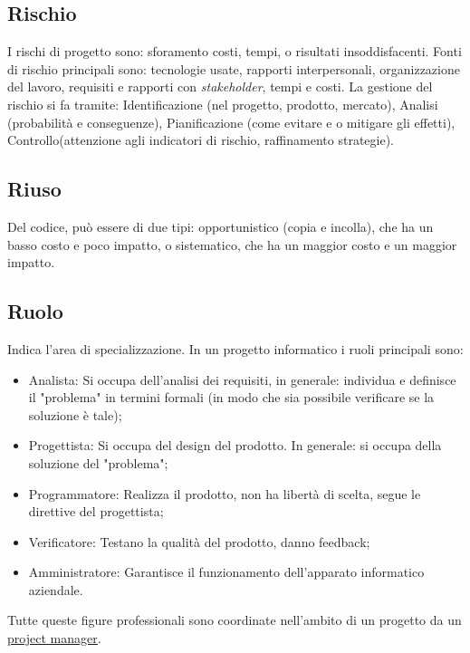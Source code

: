 	
	\subsection{Rischio}
	\label{sec:rischio}
	I rischi di progetto sono: sforamento costi, tempi, o risultati insoddisfacenti. Fonti di rischio principali sono:
	tecnologie usate, rapporti interpersonali, organizzazione del lavoro, requisiti e rapporti con  \emph{stakeholder}, tempi e costi.
	La gestione del rischio si fa tramite:
	Identificazione (nel progetto, prodotto, mercato), Analisi (probabilità e conseguenze), Pianificazione (come evitare e o mitigare gli effetti), Controllo(attenzione agli indicatori di rischio, raffinamento strategie).

	
	\subsection{Riuso}
	\label{sec:riuso}
	Del codice, può essere di due tipi: opportunistico (copia e incolla), che ha un basso costo e poco impatto, o sistematico, che ha un maggior costo e un maggior impatto.

	
	\subsection{Ruolo}
	\label{sec:ruolo}
	Indica l'area di specializzazione.
	In un progetto informatico i ruoli principali sono:
	\begin{itemize}
	\item Analista: Si occupa dell'analisi dei requisiti, in generale: individua e definisce il "problema" in termini formali (in modo che sia possibile verificare se la soluzione è tale);
	\item Progettista: Si occupa del design del prodotto. In generale: si occupa della soluzione del "problema";
	\item Programmatore: Realizza il prodotto, non ha libertà di scelta, segue le direttive del progettista;
	\item Verificatore: Testano la qualità del prodotto, danno feedback;
	\item Amministratore: Garantisce il funzionamento dell'apparato informatico aziendale.
	\end{itemize}
	Tutte queste figure professionali sono coordinate nell'ambito di un progetto da un \underline{\hyperref[sec:projectmanager]{project manager}}.
	
	
	\newpage

